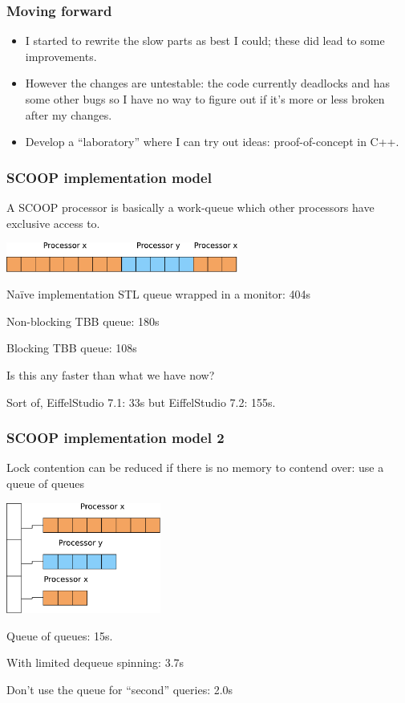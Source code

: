 \documentclass{beamer}
\begin{document}
\begin{frame}
  \frametitle{Moving forward}

  \begin{itemize}[<+->]
  \item I started to rewrite the slow parts as best I could;
    these did lead to some improvements.
  \item However the changes are untestable: the code currently
    deadlocks and has some other bugs so
    I have no way to figure out if it's more or less broken 
    after my changes.
  \item Develop a ``laboratory'' where I can try out ideas: 
    proof-of-concept in C++.
  \end{itemize}
\end{frame}

\begin{frame}
  \frametitle{SCOOP implementation model}
  
  A SCOOP processor is basically a work-queue which
  other processors have exclusive access to.
  \begin{center}
    \includegraphics[width=3in]{queue-naive}
  \end{center}

  \pause
  Na\"ive implementation STL queue wrapped in a monitor: 404s

  \pause
  Non-blocking TBB queue: 180s

  \pause
  Blocking TBB queue: 108s

  \pause
  \vskip 1cm
  Is this any faster than what we have now?
  \pause

  Sort of, EiffelStudio 7.1: 33s but EiffelStudio 7.2: 155s.
\end{frame}

\begin{frame}
  \frametitle{SCOOP implementation model 2}
  
  Lock contention can be reduced if there is no
  memory to contend over:
  use a queue of queues

  \begin{center}
    \includegraphics[width=2in]{queue-of-queues}
  \end{center}
  \pause
  Queue of queues: 15s.

  \pause
  With limited dequeue spinning: 3.7s

  \pause
  Don't use the queue for ``second'' queries: 2.0s
\end{frame}
\end{document}
